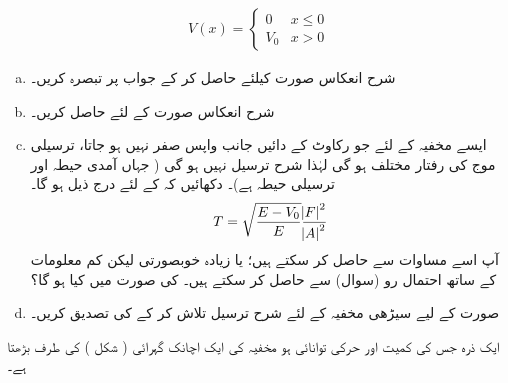 \begin{align*}
V(x)=
\begin{cases}
0 & x\le 0\\
V_{0}&x> 0
\end{cases}
\end{align*}
%
\begin{enumerate}[a.]
\item
 شرح انعکاس  صورت کیلئے حاصل کر کے جواب پر تبصرہ کریں۔ 
\item
شرح انعکاس  صورت کے لئے حاصل کریں۔ 
\item
ایسے مخفیہ کے لئے جو رکاوٹ کے دائیں جانب واپس صفر نہیں ہو جاتا، ترسیلی موج کی رفتار مختلف ہو گی لہٰذا شرح ترسیل نہیں ہو گی ( جہاں آمدی حیطہ اور ترسیلی حیطہ ہے)۔ دکھائیں کہ  کے لئے درج ذیل ہو گا۔
\begin{align}
 T=\sqrt{\frac{E-V_{0}}{E} }\frac{\abs{F}^{2}}{\abs{A}^{2}} 
 \end{align}
  آپ اسے مساوات سے حاصل کر سکتے ہیں؛ یا زیادہ خوبصورتی لیکن کم معلومات کے ساتھ احتمال رو (سوال) سے حاصل کر سکتے ہیں۔  کی صورت میں  کیا ہو گا؟
\item

صورت  کے لیے سیڑھی مخفیہ کے لئے شرح ترسیل تلاش کر کے  کی تصدیق کریں۔
\end{enumerate}
ایک ذرہ جس کی کمیت  اور حرکی توانائی  ہو مخفیہ کی ایک اچانک گہرائی ( شکل ) کی طرف بڑھتا ہے۔ 

